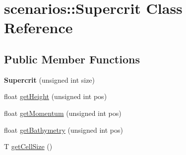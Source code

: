 \hypertarget{classscenarios_1_1Supercrit}{\section{scenarios\-:\-:Supercrit Class Reference}
\label{classscenarios_1_1Supercrit}
}
\subsection*{Public Member Functions}
\begin{DoxyCompactItemize}
\item 
\hypertarget{classscenarios_1_1Supercrit_af69be23eb9bc489cbc598ac204f4ccb7}{{\bfseries Supercrit} (unsigned int size)}\label{classscenarios_1_1Supercrit_af69be23eb9bc489cbc598ac204f4ccb7}

\item 
float \hyperlink{classscenarios_1_1Supercrit_af6f2955583f4f58486e663d2f29607d2}{get\-Height} (unsigned int pos)
\item 
float \hyperlink{classscenarios_1_1Supercrit_a60d7dd2d54e138453c1f3524b3aa3a1f}{get\-Momentum} (unsigned int pos)
\item 
float \hyperlink{classscenarios_1_1Supercrit_ab86c7f4a3aa6e5b916b15d88e0ff65d1}{get\-Bathymetry} (unsigned int pos)
\item 
T \hyperlink{classscenarios_1_1Supercrit_a8b2153d87e171cef12e5a357d7b23c66}{get\-Cell\-Size} ()
\end{DoxyCompactItemize}


